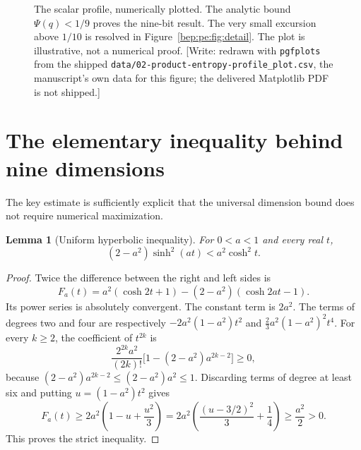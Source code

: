 \documentclass[11pt]{article}
\numberwithin{equation}{section}
\newtheorem{lemma}[theorem]{Lemma}
\theoremstyle{definition}
\theoremstyle{remark}
\begin{document}
\begin{figure}[tbp]
\centering
{}
\caption{The scalar profile, numerically plotted. The analytic bound
$\Psi(q)<1/9$ proves the nine-bit result. The very small excursion above
$1/10$ is resolved in Figure~\ref{bep:pe:fig:detail}. The plot is illustrative,
not a numerical proof. [Write: redrawn with \texttt{pgfplots} from the
shipped \nolinkurl{data/02-product-entropy-profile_plot.csv}, the
manuscript's own data for this figure; the delivered Matplotlib PDF is not
shipped.]}
\label{bep:pe:fig:profile}
\end{figure}

\section{The elementary inequality behind nine dimensions}\label{bep:pe:sec:nine}
The key estimate is sufficiently explicit that the universal dimension
bound does not require numerical maximization.

\begin{lemma}[Uniform hyperbolic inequality]\label{bep:pe:lem:ineq}
For $0<a<1$ and every real $t$,
\begin{equation}
 (2-a^2)\sinh^2(at)<a^2\cosh^2t.\label{bep:pe:eq:keyineq}
\end{equation}
\end{lemma}
\begin{proof}
Twice the difference between the right and left sides is
\[
 F_a(t)=a^2(\cosh2t+1)-(2-a^2)(\cosh2at-1).
\]
Its power series is absolutely convergent. The constant term is $2a^2$.
The terms of degrees two and four are respectively
$-2a^2(1-a^2)t^2$ and $\tfrac23a^2(1-a^2)^2t^4$.
For every $k\geq2$, the coefficient of $t^{2k}$ is
\[
 \frac{2^{2k}a^2}{(2k)!}
 \bigl[1-(2-a^2)a^{2k-2}\bigr]\geq0,
\]
because $(2-a^2)a^{2k-2}\leq(2-a^2)a^2\leq1$.
Discarding terms of degree at least six and putting
$u=(1-a^2)t^2$ gives
\[
 F_a(t)\geq2a^2\left(1-u+\frac{u^2}{3}\right)
 =2a^2\left(\frac{(u-3/2)^2}{3}+\frac14\right)
 \geq\frac{a^2}{2}>0.
\]
This proves the strict inequality.
\end{proof}
\end{document}
